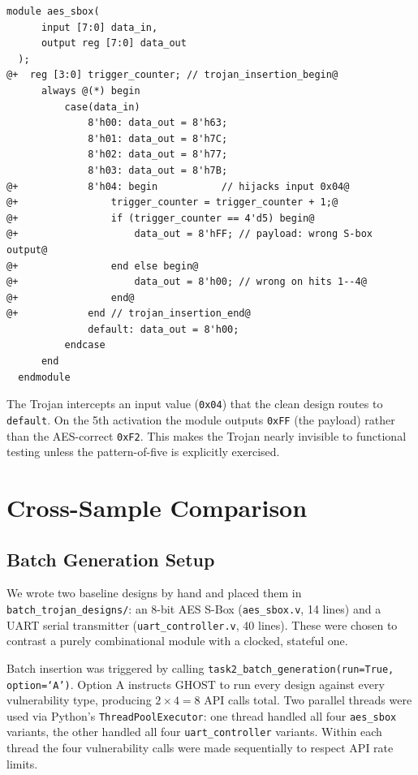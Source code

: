 \documentclass[11pt]{article}
\begin{document}
\begin{lstlisting}[style=diff]
  module aes_sbox(
      input [7:0] data_in,
      output reg [7:0] data_out
  );
@+  reg [3:0] trigger_counter; // trojan_insertion_begin@
      always @(*) begin
          case(data_in)
              8'h00: data_out = 8'h63;
              8'h01: data_out = 8'h7C;
              8'h02: data_out = 8'h77;
              8'h03: data_out = 8'h7B;
@+            8'h04: begin           // hijacks input 0x04@
@+                trigger_counter = trigger_counter + 1;@
@+                if (trigger_counter == 4'd5) begin@
@+                    data_out = 8'hFF; // payload: wrong S-box output@
@+                end else begin@
@+                    data_out = 8'h00; // wrong on hits 1--4@
@+                end@
@+            end // trojan_insertion_end@
              default: data_out = 8'h00;
          endcase
      end
  endmodule
\end{lstlisting}

The Trojan intercepts an input value (\texttt{0x04}) that the clean design routes to \texttt{default}. On the 5th activation the module outputs \texttt{0xFF} (the payload) rather than the AES-correct \texttt{0xF2}. This makes the Trojan nearly invisible to functional testing unless the pattern-of-five is explicitly exercised.

\section{Cross-Sample Comparison}
\label{sec:comparison}

\subsection{Batch Generation Setup}

We wrote two baseline designs by hand and placed them in \texttt{batch\_trojan\_designs/}: an 8-bit AES S-Box (\texttt{aes\_sbox.v}, 14 lines) and a UART serial transmitter (\texttt{uart\_controller.v}, 40 lines). These were chosen to contrast a purely combinational module with a clocked, stateful one.

Batch insertion was triggered by calling \texttt{task2\_batch\_generation(run=True, option=`A')}. Option A instructs GHOST to run every design against every vulnerability type, producing $2 \times 4 = 8$ API calls total. Two parallel threads were used via Python's \texttt{ThreadPoolExecutor}: one thread handled all four \texttt{aes\_sbox} variants, the other handled all four \texttt{uart\_controller} variants. Within each thread the four vulnerability calls were made sequentially to respect API rate limits.
\end{document}
